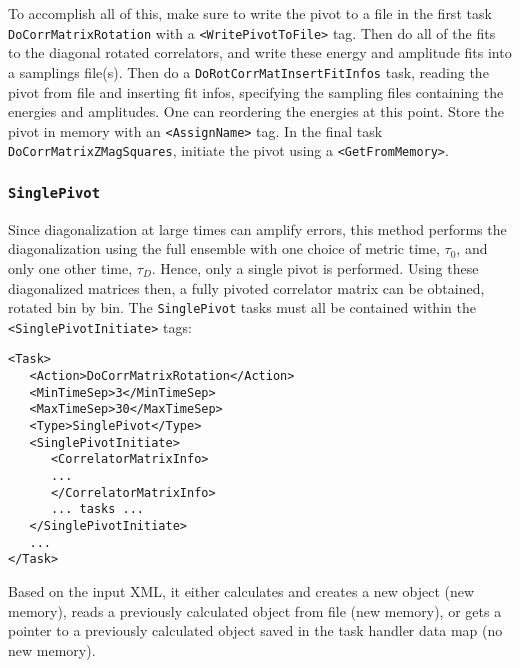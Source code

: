 \documentclass[12pt]{article}
\newcommand{\vb}{\texttt}
\begin{document}
To accomplish all of this, make sure to write the pivot to a file in the
first task \\\vb{DoCorrMatrixRotation} with a \vb{<WritePivotToFile>} tag.  Then
do all of the fits to the diagonal rotated correlators, and write these
energy and amplitude fits into a samplings file(s).  Then do a
\vb{DoRotCorrMatInsertFitInfos} task, reading the pivot from file and inserting
fit infos, specifying the sampling files containing the energies and
amplitudes.  One can reordering the energies at this point.  Store the pivot
in memory with an \vb{<AssignName>} tag. In the final task
\vb{DoCorrMatrixZMagSquares}, initiate the pivot using a \vb{<GetFromMemory>}.


\subsubsection{\vb{SinglePivot}}
Since diagonalization at large times can amplify errors, this method performs the
diagonalization using the full ensemble with one choice of metric time, $\tau_0$,
and only one other time, $\tau_D$. Hence, only a single pivot is performed.
Using these diagonalized matrices then, a fully pivoted correlator matrix can be
obtained, rotated bin by bin. The \vb{SinglePivot} tasks must all be contained
within the \vb{<SinglePivotInitiate>} tags:
\begin{verbatim}
<Task>
   <Action>DoCorrMatrixRotation</Action>
   <MinTimeSep>3</MinTimeSep>
   <MaxTimeSep>30</MaxTimeSep>
   <Type>SinglePivot</Type>
   <SinglePivotInitiate>
      <CorrelatorMatrixInfo>
      ...
      </CorrelatorMatrixInfo>
      ... tasks ...
   </SinglePivotInitiate>
   ...
</Task>
\end{verbatim}

Based on the input XML, it either calculates and creates a new object (new memory),
reads a previously calculated object from file (new memory), or gets a pointer to
a previously calculated object saved in the task handler data map (no new memory).
\end{document}
